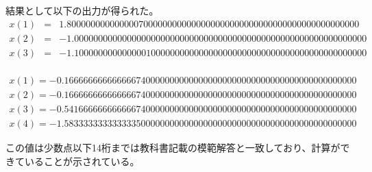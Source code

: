 \documentclass[a4paper,11pt]{jsarticle}
\begin{document}
結果として以下の出力が得られた。
\begin{equation}
    \begin{aligned}
        x( 1 ) &=& 1.8000000000000007000000000000000000000000000000000000000000000 \\
        x( 2 ) &=& -1.0000000000000000000000000000000000000000000000000000000000000 \\
        x( 3 ) &=& -1.1000000000000001000000000000000000000000000000000000000000000
    \end{aligned}
\end{equation}
\\
\begin{equation}
    \begin{aligned}
        x( 1 ) = -0.1666666666666667400000000000000000000000000000000000000000000 \\
        x( 2 ) = -0.1666666666666667400000000000000000000000000000000000000000000 \\
        x( 3 ) = -0.5416666666666667400000000000000000000000000000000000000000000 \\
        x( 4 ) = -1.5833333333333335000000000000000000000000000000000000000000000
    \end{aligned}
\end{equation}

この値は少数点以下14桁までは教科書記載の模範解答と一致しており、計算ができていることが示されている。
\end{document}
